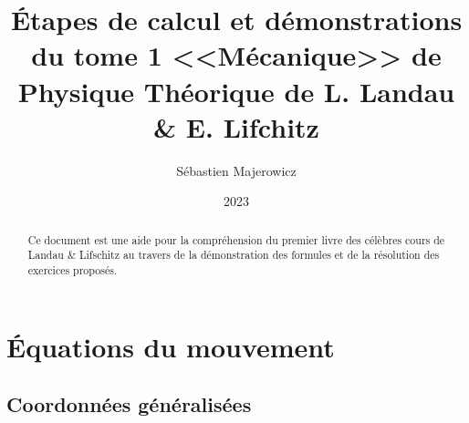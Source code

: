 \documentclass[12pt,a4paper]{memoir} %
\title{\'Etapes de calcul et d\'emonstrations du tome 1 <<M\'ecanique>>  de Physique Th\'eorique de L. Landau \&  E. Lifchitz}
\author{S\'ebastien Majerowicz}
\date{2023} %
\begin{document}
\maketitle

\begin{abstract}
Ce document est une aide pour la compréhension du premier livre des célèbres cours de Landau \& Lifschitz au travers de la démonstration des formules et de la résolution des exercices propos\'es.
\end{abstract}

\tableofcontents* %

\clearpage
{}
\setcounter{page}{1}

\chapter{\'Equations du mouvement}
\section{Coordonn\'ees g\'en\'eralis\'ees}
\end{document}

